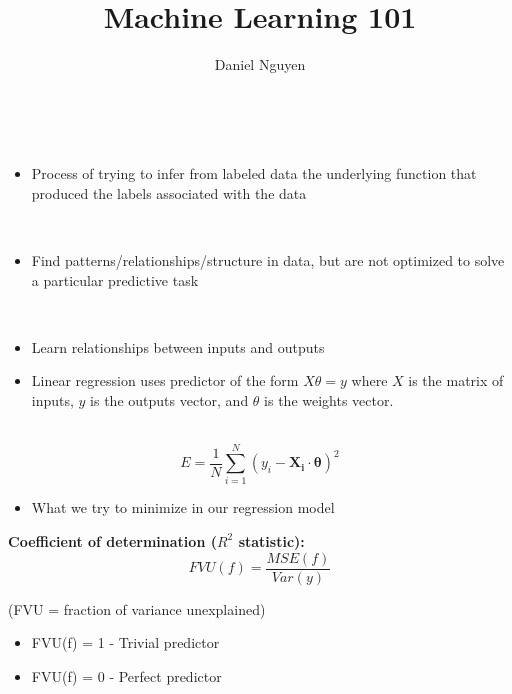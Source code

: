 \documentclass[12pt]{article}
\newenvironment{concept}[1]{\begin{trivlist}
		\item[\hskip \labelsep {\bfseries #1}]}{\end{trivlist}}
\begin{document}
 
\title{Machine Learning 101}
\author{Daniel Nguyen}
\maketitle
 
\begin{concept}{Supervised Learning}
	\
	\begin{itemize}
		\item {
			Process of trying to infer from labeled data the underlying function that produced the labels associated with the data
		}
	\end{itemize}
\end{concept}

\begin{concept}{Unsupervised Learning}
	\
	\begin{itemize}
		\item {
			Find patterns/relationships/structure in data, but are not optimized to solve a particular predictive task
		}
	\end{itemize}
\end{concept}
\begin{concept}{Regression}
	\
	\begin{itemize}
		\item {
			Learn relationships between inputs and outputs
		}
		\item {
			Linear regression uses predictor of the form $X\theta = y$ where $X$ is the matrix of inputs, $y$ is the outputs vector, and $\theta$ is the weights vector.
		}
	\end{itemize}
\end{concept}

\begin{concept}{Mean-squared Error}
	\
	$$E = \frac{1}{N} \sum_{i=1}^{N} (y_i - \boldsymbol{X_i} \cdot \boldsymbol{\theta})^2$$
	\begin{itemize}
		\item {
			What we try to minimize in our regression model
		}
	\end{itemize}

	\textbf{Coefficient of determination ($R^2$ statistic):}
	$$FVU(f) = \frac{MSE(f)}{Var(y)}$$
	
	(FVU = fraction of variance unexplained)
	\begin{itemize}
		\item {
			FVU(f) = 1 - Trivial predictor
		}
		\item {
			FVU(f) = 0 - Perfect predictor
		}
	\end{itemize}
\end{concept}
\end{document}
